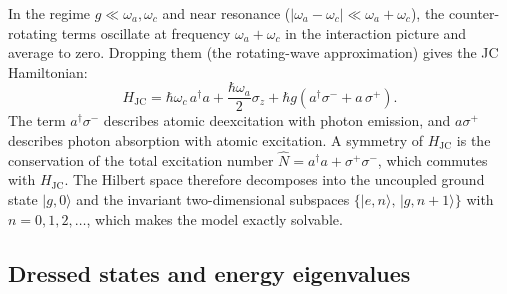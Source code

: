 \documentclass[%
 reprint,
 amsmath,amssymb,
 aps,
 floatfix,
]{revtex4-2}
\begin{document}
In the regime $g \ll \omega_a, \omega_c$ and near resonance ($|\omega_a - \omega_c| \ll \omega_a + \omega_c$), the counter-rotating terms oscillate at frequency $\omega_a + \omega_c$ in the interaction picture and average to zero. Dropping them (the rotating-wave approximation) gives the JC Hamiltonian:
\begin{equation}
H_{\text{JC}} = \hbar\omega_c\, a^\dagger a + \frac{\hbar\omega_a}{2}\sigma_z + \hbar g\left(a^\dagger \sigma^- + a\,\sigma^+\right).
\label{eq:HJC}
\end{equation}
The term $a^\dagger\sigma^-$ describes atomic deexcitation with photon emission, and $a\sigma^+$ describes photon absorption with atomic excitation. A symmetry of $H_{\text{JC}}$ is the conservation of the total excitation number $\hat{N} = a^\dagger a + \sigma^+\sigma^-$, which commutes with $H_{\text{JC}}$. The Hilbert space therefore decomposes into the uncoupled ground state $|g, 0\rangle$ and the invariant two-dimensional subspaces $\{|e, n\rangle,\, |g, n{+}1\rangle\}$ with $n = 0, 1, 2, \ldots$, which makes the model exactly solvable.


\subsection{Dressed states and energy eigenvalues}
\label{sec:dressed}
\end{document}
